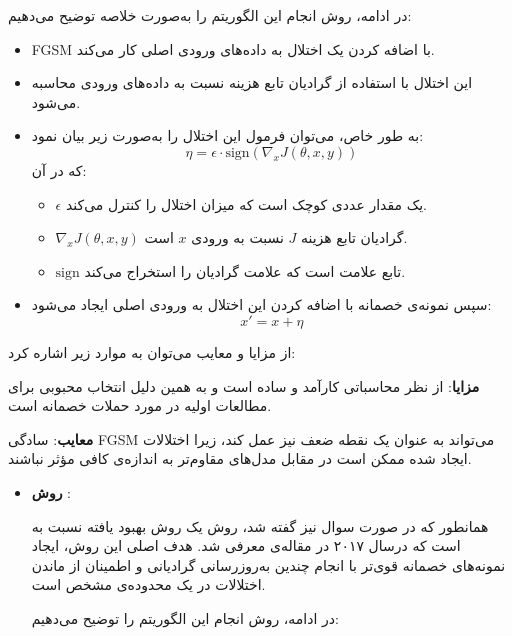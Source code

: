 \begin{qsolve}
	در ادامه، روش انجام این الگوریتم را به‌صورت خلاصه توضیح می‌دهیم:
	
	\begin{itemize}
		\item FGSM با اضافه کردن یک اختلال به داده‌های ورودی اصلی کار می‌کند.
		\item این اختلال با استفاده از گرادیان تابع هزینه نسبت به داده‌های ورودی محاسبه می‌شود.
		\item به طور خاص، می‌توان فرمول این اختلال را به‌صورت زیر بیان نمود:
		\[
		\eta = \epsilon \cdot \text{sign}(\nabla_x J(\theta, x, y))
		\]
		که در آن:
		\begin{itemize}
			\item \(\epsilon\) یک مقدار عددی کوچک است که میزان اختلال را کنترل می‌کند.
			\item \(\nabla_x J(\theta, x, y)\) گرادیان تابع هزینه \(J\) نسبت به ورودی \(x\) است.
			\item \(\text{sign}\) تابع علامت است که علامت گرادیان را استخراج می‌کند.
		\end{itemize}
		\item سپس نمونه‌ی خصمانه با اضافه کردن این اختلال به ورودی اصلی ایجاد می‌شود:
		\[
		x' = x + \eta
		\]
	\end{itemize}
	
	از مزایا و معایب  می‌توان به موارد زیر اشاره کرد:
	
	\textbf{مزایا}: از نظر محاسباتی کارآمد و ساده است و به همین دلیل انتخاب محبوبی برای مطالعات اولیه در مورد حملات خصمانه است.
	
	\textbf{معایب}: سادگی FGSM می‌تواند به عنوان یک نقطه ضعف نیز عمل کند، زیرا اختلالات ایجاد شده ممکن است در مقابل مدل‌های مقاوم‌تر به اندازه‌ی کافی مؤثر نباشند.
	
	
	\begin{itemize}
		\item \textbf{روش }:
		
همانطور که در صورت سوال نیز گفته شد، روش  یک روش بهبود یافته نسبت به  است که درسال ۲۰۱۷ در مقاله‌ی  معرفی شد. هدف اصلی این روش، ایجاد نمونه‌های خصمانه قوی‌تر با انجام چندین به‌روزرسانی گرادیانی و اطمینان از ماندن اختلالات در یک محدوده‌ی مشخص است.

در ادامه، روش انجام این الگوریتم را توضیح می‌دهیم:


\end{itemize}
\end{qsolve}
